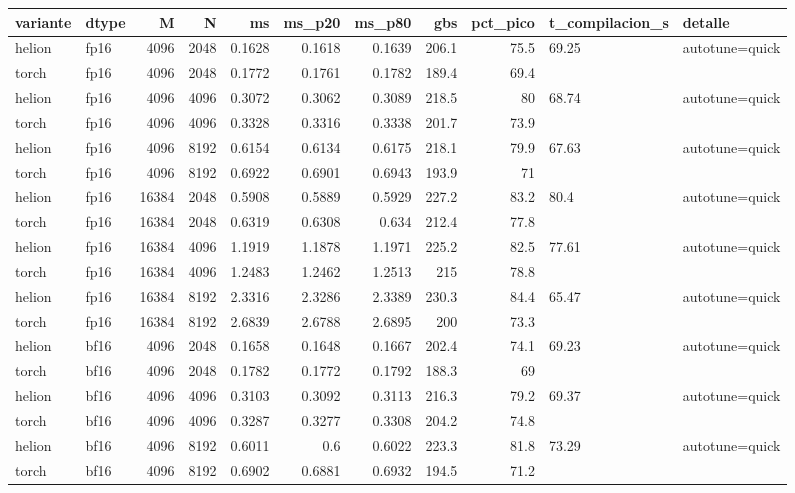 \begin{table}[htbp]
  \centering\small
  \begin{tabular}{llrrrrrrrll}
    \toprule
    variante & dtype & M & N & ms & ms\_p20 & ms\_p80 & gbs & pct\_pico & t\_compilacion\_s & detalle \\
    \midrule
    helion & fp16 & 4096 & 2048 & 0.1628 & 0.1618 & 0.1639 & 206.1 & 75.5 & 69.25 & autotune=quick \\
    torch & fp16 & 4096 & 2048 & 0.1772 & 0.1761 & 0.1782 & 189.4 & 69.4 &  &  \\
    helion & fp16 & 4096 & 4096 & 0.3072 & 0.3062 & 0.3089 & 218.5 & 80 & 68.74 & autotune=quick \\
    torch & fp16 & 4096 & 4096 & 0.3328 & 0.3316 & 0.3338 & 201.7 & 73.9 &  &  \\
    helion & fp16 & 4096 & 8192 & 0.6154 & 0.6134 & 0.6175 & 218.1 & 79.9 & 67.63 & autotune=quick \\
    torch & fp16 & 4096 & 8192 & 0.6922 & 0.6901 & 0.6943 & 193.9 & 71 &  &  \\
    helion & fp16 & 16384 & 2048 & 0.5908 & 0.5889 & 0.5929 & 227.2 & 83.2 & 80.4 & autotune=quick \\
    torch & fp16 & 16384 & 2048 & 0.6319 & 0.6308 & 0.634 & 212.4 & 77.8 &  &  \\
    helion & fp16 & 16384 & 4096 & 1.1919 & 1.1878 & 1.1971 & 225.2 & 82.5 & 77.61 & autotune=quick \\
    torch & fp16 & 16384 & 4096 & 1.2483 & 1.2462 & 1.2513 & 215 & 78.8 &  &  \\
    helion & fp16 & 16384 & 8192 & 2.3316 & 2.3286 & 2.3389 & 230.3 & 84.4 & 65.47 & autotune=quick \\
    torch & fp16 & 16384 & 8192 & 2.6839 & 2.6788 & 2.6895 & 200 & 73.3 &  &  \\
    helion & bf16 & 4096 & 2048 & 0.1658 & 0.1648 & 0.1667 & 202.4 & 74.1 & 69.23 & autotune=quick \\
    torch & bf16 & 4096 & 2048 & 0.1782 & 0.1772 & 0.1792 & 188.3 & 69 &  &  \\
    helion & bf16 & 4096 & 4096 & 0.3103 & 0.3092 & 0.3113 & 216.3 & 79.2 & 69.37 & autotune=quick \\
    torch & bf16 & 4096 & 4096 & 0.3287 & 0.3277 & 0.3308 & 204.2 & 74.8 &  &  \\
    helion & bf16 & 4096 & 8192 & 0.6011 & 0.6 & 0.6022 & 223.3 & 81.8 & 73.29 & autotune=quick \\
    torch & bf16 & 4096 & 8192 & 0.6902 & 0.6881 & 0.6932 & 194.5 & 71.2 &  &  \\

\end{tabular}
\end{table}

